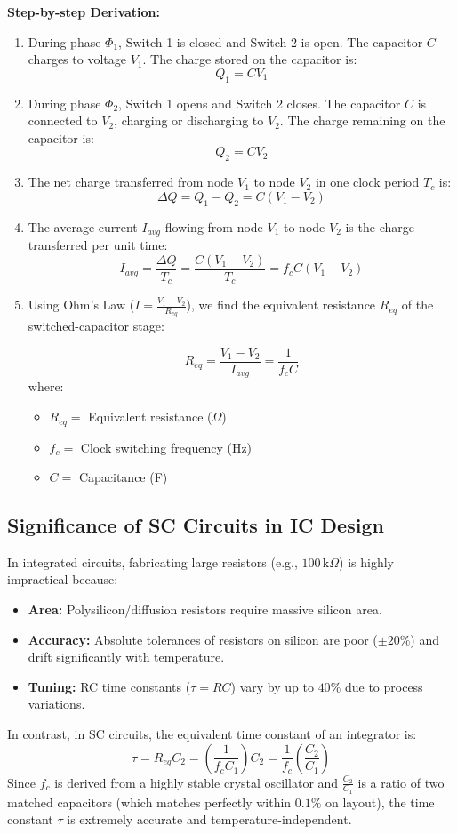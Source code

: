 \documentclass[12pt,a4paper]{article}
\begin{document}
\textbf{Step-by-step Derivation:}
\begin{enumerate}[label=\textbf{\arabic*.}, leftmargin=*, itemsep=3pt]
  \item During phase $\Phi_1$, Switch 1 is closed and Switch 2 is open. The capacitor $C$ charges to voltage $V_1$.
  The charge stored on the capacitor is:
  \[
  Q_1 = C V_1
  \]
  \item During phase $\Phi_2$, Switch 1 opens and Switch 2 closes. The capacitor $C$ is connected to $V_2$, charging or discharging to $V_2$.
  The charge remaining on the capacitor is:
  \[
  Q_2 = C V_2
  \]
  \item The net charge transferred from node $V_1$ to node $V_2$ in one clock period $T_c$ is:
  \[
  \Delta Q = Q_1 - Q_2 = C(V_1 - V_2)
  \]
  \item The average current $I_{avg}$ flowing from node $V_1$ to node $V_2$ is the charge transferred per unit time:
  \[
  I_{avg} = \frac{\Delta Q}{T_c} = \frac{C(V_1 - V_2)}{T_c} = f_c C (V_1 - V_2)
  \]
  \item Using Ohm's Law ($I = \frac{V_1 - V_2}{R_{eq}}$), we find the equivalent resistance $R_{eq}$ of the switched-capacitor stage:
  \begin{tcolorbox}[formulabox, title={\textbf{SC Equivalent Resistance}}]
  \[
  R_{eq} = \frac{V_1 - V_2}{I_{avg}} = \frac{1}{f_c C}
  \]
  where:
  \begin{itemize}[leftmargin=1.5em, itemsep=1pt]
    \item $R_{eq} = $ Equivalent resistance ($\Omega$)
    \item $f_c = $ Clock switching frequency (Hz)
    \item $C = $ Capacitance (F)
  \end{itemize}
  \end{tcolorbox}
\end{enumerate}

\subsection{Significance of SC Circuits in IC Design}
In integrated circuits, fabricating large resistors (e.g., $100\,$k$\Omega$) is highly impractical because:
\begin{itemize}[leftmargin=*, itemsep=2pt]
  \item \textbf{Area:} Polysilicon/diffusion resistors require massive silicon area.
  \item \textbf{Accuracy:} Absolute tolerances of resistors on silicon are poor ($\pm 20\%$) and drift significantly with temperature.
  \item \textbf{Tuning:} RC time constants ($\tau = RC$) vary by up to $40\%$ due to process variations.
\end{itemize}
In contrast, in SC circuits, the equivalent time constant of an integrator is:
\[
\tau = R_{eq} C_2 = \left(\frac{1}{f_c C_1}\right) C_2 = \frac{1}{f_c} \left(\frac{C_2}{C_1}\right)
\]
Since $f_c$ is derived from a highly stable crystal oscillator and $\frac{C_2}{C_1}$ is a ratio of two matched capacitors (which matches perfectly within $0.1\%$ on layout), the time constant $\tau$ is extremely accurate and temperature-independent.
\end{document}

